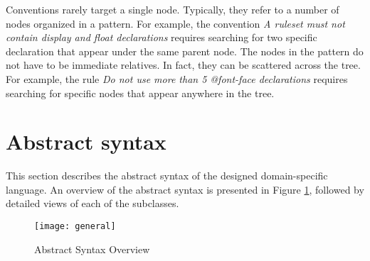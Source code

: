 \documentclass[parskip=full]{uvamscse}
\begin{document}
Conventions rarely target a single node. Typically, they refer to a number of nodes organized in a
pattern. For example, the convention \textit{A ruleset must not contain display and float
declarations} requires searching for two specific declaration that appear under the same parent
node. The nodes in the pattern do not have to be immediate relatives. In fact, they can be scattered
across the tree. For example, the rule \textit{Do not use more than 5 @font-face declarations}
requires searching for specific nodes that appear anywhere in the tree.

\section{Abstract syntax}

This section describes the abstract syntax of the designed domain-specific language. An overview of
the abstract syntax is presented in Figure \ref{fig:astgeneral}, followed by detailed views of each
of the subclasses.

\begin{figure}[h!]
  \centering
  \caption{Abstract Syntax Overview}
  \label{fig:astgeneral}
  \texttt{[image: general]}
\end{figure}
\end{document}
